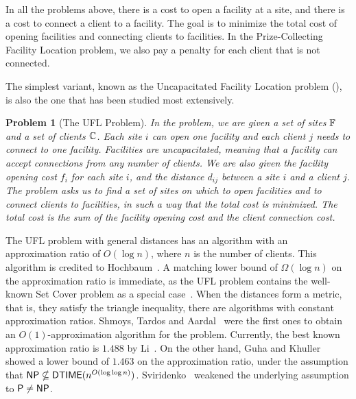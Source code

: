 \documentclass[oneside,final]{ucr}
\newtheorem{problem}[theorem]{Problem}
\begin{document}
In all the problems above, there is a cost to open a
facility at a site, and there is a cost to connect a client
to a facility. The goal is to minimize the total cost of
opening facilities and connecting clients to facilities. In
the Prize-Collecting Facility Location problem, we also pay
a penalty for each client that is not connected.

The simplest variant, known as the Uncapacitated Facility
Location problem ({\UFL}), is also the one that has been
studied most extensively. 
\begin{problem}[The UFL Problem]
  In the {\UFL} problem, we are given a set of sites
  $\mathbb{F}$ and a set of clients $\mathbb{C}$. Each site
  $i$ can open one facility and each client $j$ needs to
  connect to one facility. Facilities are uncapacitated,
  meaning that a facility can accept connections from any
  number of clients. We are also given the facility opening
  cost $f_i$ for each site $i$, and the distance $d_{ij}$
  between a site $i$ and a client $j$. The problem asks us
  to find a set of sites on which to open facilities and to
  connect clients to facilities, in such a way that the
  total cost is minimized. The total cost is the sum of the
  facility opening cost and the client connection cost.
\end{problem}
The UFL problem with general distances has an algorithm with
an approximation ratio of $O(\log n)$, where $n$ is the
number of clients. This algorithm is credited to
Hochbaum~\cite{Hochbaum82}. A matching lower bound of
$\Omega(\log n)$ on the approximation ratio is immediate, as
the UFL problem contains the well-known Set Cover problem as
a special case~\cite{Hochbaum82}. When the distances form a
metric, that is, they satisfy the triangle inequality, there
are algorithms with constant approximation ratios. Shmoys,
Tardos and Aardal~\cite{ShmoysTA97} were the first ones to
obtain an $O(1)$-approximation algorithm for the {\UFL}
problem. Currently, the best known approximation ratio is
$1.488$ by Li~\cite{Li11}. On the other hand, Guha and
Khuller~\cite{GuhaK98} showed a lower bound of $1.463$ on
the approximation ratio, under the assumption that ${\mbox{\sf NP}}
\nsubseteq {\mbox{\sf DTIME}}(n^{O(\log\log
  n)})$. Sviridenko~\cite{Vygen05} weakened the underlying
assumption to ${\mbox{\sf P}} \neq {\mbox{\sf NP}}$.
\end{document}

